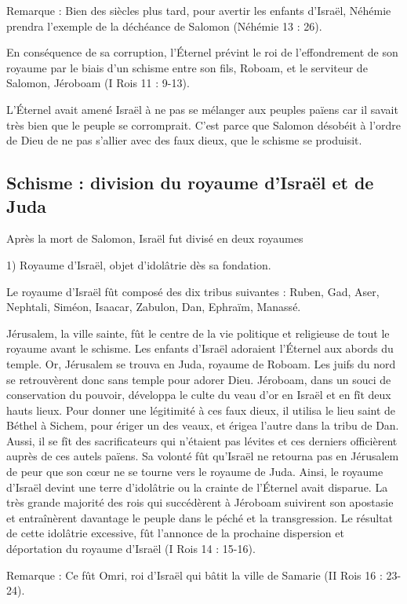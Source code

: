 Remarque : Bien des siècles plus tard, pour avertir les enfants d'Israël, Néhémie prendra l'exemple de la déchéance de Salomon (Néhémie 13 : 26).

En conséquence de sa corruption, l’Éternel prévint le roi de l'effondrement de son royaume par le biais d'un schisme entre son fils, Roboam, et le serviteur de Salomon, Jéroboam (I Rois 11 : 9-13).

L’Éternel avait amené Israël à ne pas se mélanger aux peuples païens car il savait très bien que le peuple se corromprait. C'est parce que Salomon désobéit à l'ordre de Dieu de ne pas s'allier avec des faux dieux, que le schisme se produisit.

\subsection*{Schisme : division du royaume d'Israël et de Juda}

Après la mort de Salomon, Israël fut divisé en deux royaumes

1) Royaume d'Israël, objet d'idolâtrie dès sa fondation.

Le royaume d'Israël fût composé des dix tribus suivantes : Ruben, Gad, Aser, Nephtali, Siméon, Isaacar, Zabulon, Dan, Ephraïm, Manassé.
 
Jérusalem, la ville sainte, fût le centre de la vie politique et religieuse de tout le royaume avant le schisme. Les enfants d'Israël adoraient l’Éternel aux abords du temple. Or, Jérusalem se trouva en Juda, royaume de Roboam.
Les juifs du nord se retrouvèrent donc sans temple pour adorer Dieu. Jéroboam, dans un souci de conservation du pouvoir, développa le culte du veau d'or en Israël et en fît deux hauts lieux.
Pour donner une légitimité à ces faux dieux, il utilisa le lieu saint de Béthel à Sichem, pour ériger un des veaux, et érigea l'autre dans la tribu de Dan. Aussi, il se fît des sacrificateurs qui n'étaient pas lévites et ces derniers officièrent auprès de ces autels païens. Sa volonté fût qu'Israël ne retourna pas en Jérusalem de peur que son cœur ne se tourne vers le royaume de Juda. Ainsi, le royaume d'Israël devint une terre d'idolâtrie ou la crainte de l’Éternel avait disparue. La très grande majorité des rois qui succédèrent à Jéroboam suivirent son apostasie et entraînèrent davantage le peuple dans le péché et la transgression.
Le résultat de cette idolâtrie excessive, fût l'annonce de la prochaine dispersion et déportation du royaume d'Israël (I Rois 14 : 15-16).

Remarque : Ce fût Omri, roi d'Israël qui bâtit la ville de Samarie (II Rois 16 : 23-24).

